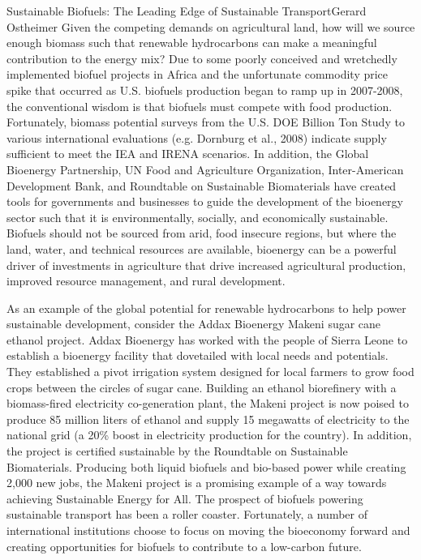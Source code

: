 \documentclass[10pt]{papertex}
\begin{document}
\begin{news}{2}{Sustainable Biofuels: The Leading Edge of Sustainable 
    Transport}{Gerard Ostheimer}{}{}
Given the competing demands on agricultural land, how will we source enough 
biomass such that renewable hydrocarbons can make a meaningful contribution to 
the energy mix? Due to some poorly conceived and wretchedly implemented biofuel 
projects in Africa and the unfortunate commodity price spike that occurred as 
U.S. biofuels production began to ramp up in 2007-2008, the conventional 
wisdom is that biofuels must compete with food production. Fortunately, 
biomass potential surveys from the U.S. DOE Billion Ton Study to various 
international evaluations (e.g. Dornburg et al., 2008) indicate supply 
sufficient to meet the IEA and IRENA scenarios. In addition, the Global 
Bioenergy Partnership, UN Food and Agriculture Organization, Inter-American 
Development Bank, and Roundtable on Sustainable Biomaterials have created 
tools for governments and businesses to guide the development of the bioenergy 
sector such that it is environmentally, socially, and economically sustainable. 
Biofuels should not be sourced from arid, food insecure regions, but where the 
land, water, and technical resources are available, bioenergy can be a 
powerful driver of investments in agriculture that drive increased 
agricultural production, improved resource management, and rural development.

As an example of the global potential for renewable hydrocarbons to help power 
sustainable development, consider the Addax Bioenergy Makeni sugar cane 
ethanol project. Addax Bioenergy has worked with the people of Sierra Leone 
to establish a bioenergy facility that dovetailed with local needs and 
potentials. They established a pivot irrigation system designed for local 
farmers to grow food crops between the circles of sugar cane. Building an 
ethanol biorefinery with a biomass-fired electricity co-generation plant, 
the Makeni project is now poised to produce 85 million liters of ethanol and 
supply 15 megawatts of electricity to the national grid (a 20\% boost in 
electricity production for the country). In addition, the project is certified 
sustainable by the Roundtable on Sustainable Biomaterials. Producing both 
liquid biofuels and bio-based power while creating 2,000 new jobs, the Makeni 
project is a promising example of a way towards achieving Sustainable Energy 
for All. The prospect of biofuels powering sustainable transport has been a 
roller coaster. Fortunately, a number of international institutions choose to 
focus on moving the bioeconomy forward and creating opportunities for biofuels 
to contribute to a low-carbon future.



\end{news}
\end{document}

